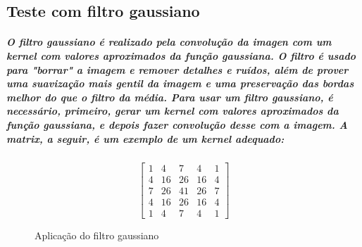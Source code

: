 \documentclass[12pt,fleqn]{article}
\begin{document}
  \subsection{Teste com filtro gaussiano}

      \subparagraph{\normalfont O filtro gaussiano é realizado pela convolução da imagen com um kernel com valores aproximados da função gaussiana. 
      O filtro é usado para "borrar" a imagem e remover detalhes e ruídos, além de prover uma suavização mais gentil da imagem e uma preservação das bordas
      melhor do que o filtro da média. Para usar um filtro gaussiano, é necessário, primeiro, gerar um kernel com valores aproximados da função gaussiana,
      e depois fazer convolução desse com a imagem. A matrix, a seguir, é um exemplo de um kernel adequado: }


      \begin{equation*}
        \begin{bmatrix}
            1 & 4 & 7 & 4 & 1 \\
            4 & 16 & 26 & 16 & 4 \\
            7 & 26 & 41 & 26 & 7 \\
            4 & 16 & 26 & 16 & 4 \\
            1 & 4 & 7 & 4 & 1 
        \end{bmatrix}
      \end{equation*}

      \newpage

      \begin{figure}[!htb]
      \centering
      \caption{Aplicação do filtro gaussiano}
      \label{fig:Resultado 1}
      \end{figure}
\end{document}
